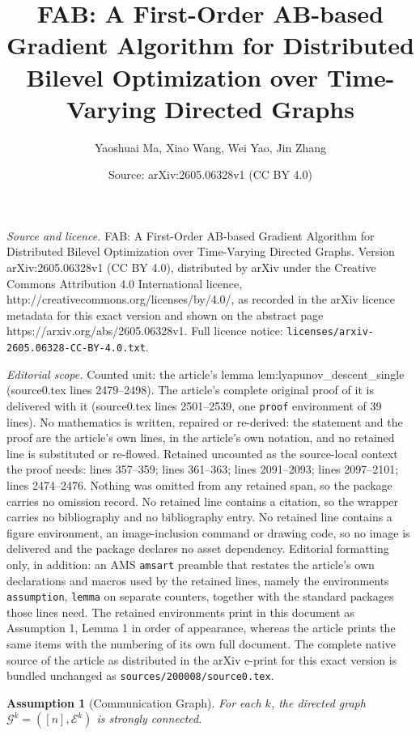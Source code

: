 \documentclass[10pt,a4paper]{amsart}
\title{FAB: A First-Order AB-based Gradient Algorithm for Distributed Bilevel Optimization over Time-Varying Directed Graphs}
\author{Yaoshuai Ma, Xiao Wang, Wei Yao, Jin Zhang}
\date{Source: arXiv:2605.06328v1 (CC BY 4.0)}
\newtheorem{assumption}{Assumption}
\begin{document}
\maketitle

\noindent\emph{Source and licence.} FAB: A First-Order AB-based Gradient Algorithm for Distributed Bilevel Optimization over Time-Varying Directed Graphs. Version arXiv:2605.06328v1 (CC BY 4.0), distributed by arXiv under the Creative Commons Attribution 4.0 International licence, http://creativecommons.org/licenses/by/4.0/, as recorded in the arXiv licence metadata for this exact version and shown on the abstract page https://arxiv.org/abs/2605.06328v1. Full licence notice: \texttt{licenses/arxiv-2605.06328-CC-BY-4.0.txt}.\par\smallskip

\noindent\textit{Editorial scope.} Counted unit: the article's lemma lem:lyapunov\_descent\_single (source0.tex lines 2479--2498). The article's complete original proof of it is delivered with it (source0.tex lines 2501--2539, one \texttt{proof} environment of 39 lines). No mathematics is written, repaired or re-derived: the statement and the proof are the article's own lines, in the article's own notation, and no retained line is substituted or re-flowed.  Retained uncounted as the source-local context the proof needs: lines 357--359; lines 361--363; lines 2091--2093; lines 2097--2101; lines 2474--2476.  Nothing was omitted from any retained span, so the package carries no omission record.  No retained line contains a citation, so the wrapper carries no bibliography and no bibliography entry.  No retained line contains a figure environment, an image-inclusion command or drawing code, so no image is delivered and the package declares no asset dependency.  Editorial formatting only, in addition: an AMS \texttt{amsart} preamble that restates the article's own declarations and macros used by the retained lines, namely the environments \texttt{assumption}, \texttt{lemma} on separate counters, together with the standard packages those lines need.  The retained environments print in this document as Assumption 1, Lemma 1 in order of appearance, whereas the article prints the same items with the numbering of its own full document.  The complete native source of the article as distributed in the arXiv e-print for this exact version is bundled unchanged as \texttt{sources/200008/source0.tex}.
\begin{assumption}[Communication Graph]\label{ass:graph}
For each $k$, the directed graph $\mathcal{G}^{k}=([n],\mathcal{E}^{k})$ is strongly connected.
\end{assumption}
\end{document}
